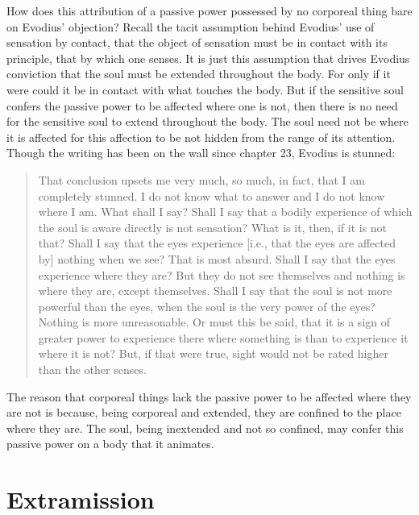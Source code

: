 \documentclass[12pt]{article}
\begin{document}
How does this attribution of a passive power possessed by no corporeal thing bare on Evodius' objection? Recall the tacit assumption behind Evodius' use of sensation by contact, that the object of sensation must be in contact with its principle, that by which one senses. It is just this assumption that drives Evodius conviction that the soul must be extended throughout the body. For only if it were could it be in contact with what touches the body. But if the sensitive soul confers the passive power to be affected where one is not, then there is no need for the sensitive soul to extend throughout the body. The soul need not be where it is affected for this affection to be not hidden from the range of its attention. Though the writing has been on the wall since chapter 23, Evodius is stunned:
\begin{quote}
	That conclusion upsets me very much, so much, in fact, that I am completely stunned. I do not know what to answer and I do not know where I am. What shall I say? Shall I say that a bodily experience of which the soul is aware directly is not sensation? What is it, then, if it is not that? Shall I say that the eyes experience [i.e., that the eyes are affected by] nothing when we see? That is most absurd. Shall I say that the eyes experience where they are? But they do not see themselves and nothing is where they are, except themselves. Shall I say that the soul is not more powerful than the eyes, when the soul is the very power of the eyes? Nothing is more unreasonable. Or must this be said, that it is a sign of greater power to experience there where something is than to experience it where it is not? But, if that were true, sight would not be rated higher than the other senses.
\end{quote}
The reason that corporeal things lack the passive power to be affected where they are not is because, being corporeal and extended, they are confined to the place where they are. The soul, being inextended and not so confined, may confer this passive power on a body that it animates.


\section{Extramission} %
\label{sec:extramission}
\end{document}

